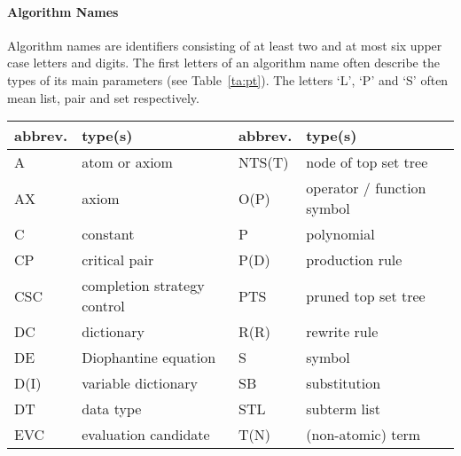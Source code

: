 \paragraph{Algorithm Names}
Algorithm names are identifiers consisting of at least two and
at most six upper case letters and digits.
The first letters of an algorithm name often describe the types of its main
parameters (see Table~\ref{ta:pt}).
The letters `L', `P' and `S' often mean list, pair and set respectively.
\begin{table}
\begin{center}
\begin{tabular}{|l|l||l|l|}
 \hline
 abbrev. & type(s)                    & abbrev. & type(s) \\
 \hline \hline
  A     & atom or axiom               
                                      &
                                        NTS(T) & node of top set tree  \\
  AX    & axiom                       &                                   
                                        O(P)  & operator / function symbol \\
  C     & constant                    &                                   
                                        P     & polynomial \\             
  CP    & critical pair               &                                   
                                        P(D)  & production rule \\        
  CSC   & completion strategy control &                                   
                                        PTS   & pruned top set tree \\    
  DC    & dictionary                  &                                   
                                        R(R)  & rewrite rule \\           
  DE    & Diophantine equation        &                                   
                                        S     & symbol \\                 
  D(I)  & variable dictionary         &                                   
                                        SB    & substitution \\           
  DT    & data type                   &                                   
                                        STL   & subterm list \\           
  EVC   & evaluation candidate        &                                   
                                        T(N)     & (non-atomic) term \\   

\end{tabular}
\end{center}
\end{table}
